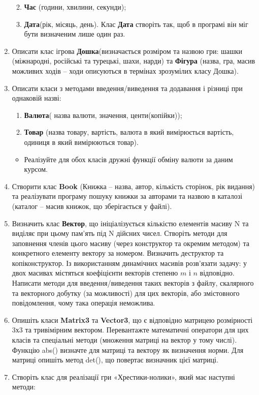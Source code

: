 \documentclass[]{article}
\begin{document}
\begin{enumerate}
  \begin{enumerate}
  \def\labelenumii{\arabic{enumii}.}
  \item
    \textbf{Час} (години, хвилини, секунди);
  \item
    \textbf{Дата}(рік, місяць, день). Клас \textbf{Дата} створіть так,
    щоб в програмі він міг бути визначеним лише один раз.
  \end{enumerate}
\item
  Описати клас ігрова \textbf{Дошка}(визначається розміром та назвою
  гри: шашки (міжнародні, російські та турецькі, шахи, нарди) та
  \textbf{Фігура} (назва, гра, масив можливих ходів -- ходи описуються в
  термінах зрозумілих класу Дошка).
\item
  Описати класи з методами введення/виведення та додавання і різниці при
  однаковій назві:

  \begin{enumerate}
  \def\labelenumii{\arabic{enumii}.}
  \item
    \textbf{Валюта}( назва валюти, значення, центи(копійки));
  \item
    \textbf{Товар} (назва товару, вартість, валюта в який вимірюється
    вартість, одиниця в який вимірюються товар).
  \end{enumerate}

  \begin{itemize}
  \item
    Реалізуйте для обох класів дружні функції обміну валюти за даним
    курсом.
  \end{itemize}
\item
  Створити клас \textbf{Book} (Книжка -- назва, автор, кількість
  сторінок, рік видання) та реалізувати програму пошуку книжки за
  авторами та назвою в каталозі (каталог -- масив книжок, що
  зберігається у файлі).
\item
  Визначить клас \textbf{Вектор}, що ініціалізується кількістю елементів
  масиву N та виділяє при цьому пам'ять під N дійсних чисел. Створіть
  методи для заповнення членів цього масиву (через конструктор та
  окремим методом) та конкретного елементу вектору за номером. Визначить
  деструктор та копіконструктор. Із використанням динамічних масивів
  розв'язати задачу: у двох масивах містяться коефіцієнти векторів
  степеню \(m\) і \(n\) відповідно. Написати методи для
  введення/виведення таких векторів з файлу, скалярного та векторного
  добутку (за можливості) для цих векторів, або змістовного
  повідомлення, чому така операція неможлива.
\item
  Опишіть класи \textbf{Matrix3} та \textbf{Vector3}, що є відповідно
  матрицею розмірності 3х3 та тривімірним вектором. Перевантажте
  математичні оператори для цих класів та спеціальні методи (множення
  матриці на вектор у тому числі). Функцію abs() визначте для матриці та
  вектору як визначення норми. Для матриці опишіть метод det(), що
  повертає визначник цієї матриці.
\item
  Створіть клас для реалізації гри «Хрестики-нолики», який має наступні
  методи:


\end{enumerate}
\end{document}
